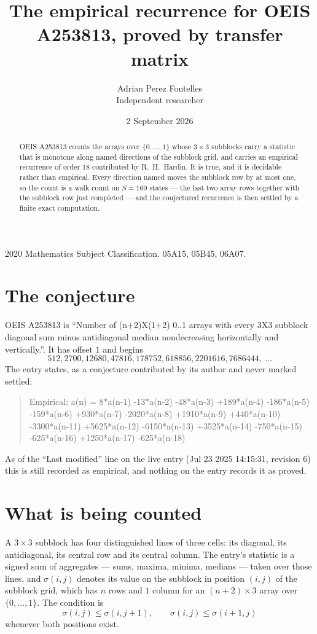 \documentclass[11pt,a4paper]{article}
\title{The empirical recurrence for OEIS A253813, proved by transfer matrix}
\author{Adrian Perez Fontelles\\ \small Independent researcher}
\date{2 September 2026}
\theoremstyle{plain}
\theoremstyle{definition}
\begin{document}
\maketitle

\begin{abstract}
OEIS A253813 counts the arrays over $\{0,\dots,1\}$ whose $3\times3$ subblocks carry a
statistic that is monotone along named directions of the subblock grid, and carries an
empirical recurrence of order $18$ contributed by R.~H.~Hardin. It is true, and it is
decidable rather than empirical. Every direction named moves the subblock row by at most one,
so the count is a walk count on $S=160$ states --- the last two array rows together with the
subblock row just completed --- and the conjectured recurrence is then settled by a finite
exact computation.
\end{abstract}

\noindent\small 2020 Mathematics Subject Classification. 05A15, 05B45, 06A07.\normalsize

\section{The conjecture}

OEIS A253813 is ``Number of (n+2)X(1+2) 0..1 arrays with every 3X3 subblock diagonal sum minus antidiagonal median nondecreasing horizontally and vertically.''. It has offset $1$ and begins
\[
512, 2700, 12680, 47816, 178752, 618856, 2201616, 7686444,\ \dots
\]
The entry states, as a conjecture contributed by its author and never marked settled:
\begin{quote}
Empirical: a(n) = 8*a(n-1) -13*a(n-2) -48*a(n-3) +189*a(n-4) -186*a(n-5) -159*a(n-6) +930*a(n-7) -2020*a(n-8) +1910*a(n-9) +440*a(n-10) -3300*a(n-11) +5625*a(n-12) -6150*a(n-13) +3525*a(n-14) -750*a(n-15) -625*a(n-16) +1250*a(n-17) -625*a(n-18)
\end{quote}
As of the ``Last modified'' line on the live entry (Jul 23 2025 14:15:31, revision 6) this is still
recorded as empirical, and nothing on the entry records it as proved.

\section{What is being counted}

A $3\times3$ subblock has four distinguished lines of three cells: its diagonal, its
antidiagonal, its central row and its central column. The entry's statistic is a signed sum of
aggregates --- sums, maxima, minima, medians --- taken over those lines, and $\sigma(i,j)$
denotes its value on the subblock in position $(i,j)$ of the subblock grid, which has $n$ rows
and $1$ column for an $(n+2)\times3$ array over $\{0,\dots,1\}$. The condition is
\[
\sigma(i,j)\le\sigma(i,j+1),\qquad \sigma(i,j)\le\sigma(i+1,j)
\]
whenever both positions exist.
\end{document}
